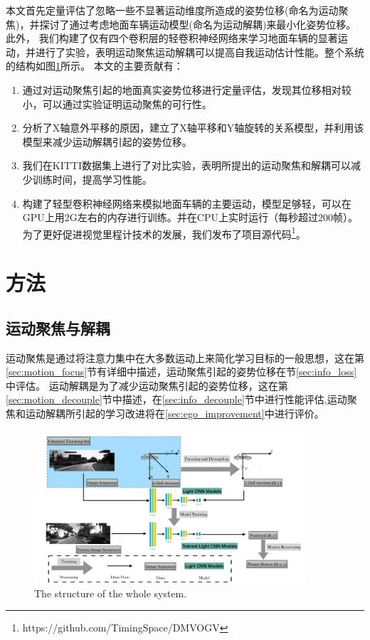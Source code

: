 本文首先定量评估了忽略一些不显著运动维度所造成的姿势位移(命名为运动聚焦)，并探讨了通过考虑地面车辆运动模型(命名为运动解耦)来最小化姿势位移。此外，
我们构建了仅有四个卷积层的轻卷积神经网络来学习地面车辆的显著运动，并进行了实验，表明运动聚焦运动解耦可以提高自我运动估计性能。整个系统的结构如图\ref{fig:system_structure}所示。
本文的主要贡献有：
\begin{enumerate}
    \item {通过对运动聚焦引起的地面真实姿势位移进行定量评估，发现其位移相对较小，可以通过实验证明运动聚焦的可行性。}
    \item {分析了X轴意外平移的原因，建立了X轴平移和Y轴旋转的关系模型，并利用该模型来减少运动解耦引起的姿势位移。}
    \item {我们在KITTI数据集上进行了对比实验，表明所提出的运动聚焦和解耦可以减少训练时间，提高学习性能。}
    \item {构建了轻型卷积神经网络来模拟地面车辆的主要运动，模型足够轻，可以在GPU上用2G左右的内存进行训练。并在CPU上实时运行（每秒超过200帧）。
    为了更好促进视觉里程计技术的发展，我们发布了项目源代码\footnote{https://github.com/TimingSpace/DMVOGV}。}
\end{enumerate}

\section{方法}
\label{sec:approach}
\subsection{运动聚焦与解耦}
\label{sec:motion}
运动聚焦是通过将注意力集中在大多数运动上来简化学习目标的一般思想，这在第\ref{sec:motion_focus}节有详细中描述，运动聚焦引起的姿势位移在节\ref{sec:info_loss}中评估。
运动解耦是为了减少运动聚焦引起的姿势位移，这在第\ref{sec:motion_decouple}节中描述，在\ref{sec:info_decouple}节中进行性能评估,运动聚焦和运动解耦所引起的学习改进将在\ref{sec:ego_improvement}中进行评价。
\begin{figure}[t]
    \centering
    \includegraphics[width=0.9\textwidth]{datavo/system_structure.pdf}
    \caption{The structure of the whole system.}
    \label{fig:system_structure}
\end{figure}

